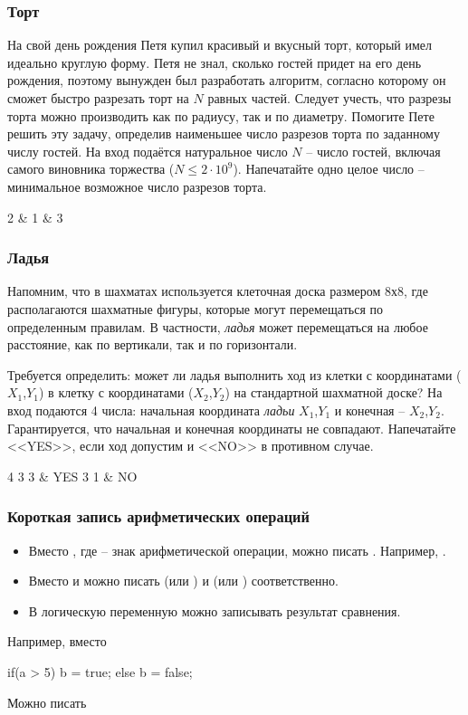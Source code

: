 \begin{frame}
	\frametitle{Торт}
	На свой день рождения Петя купил красивый и вкусный торт, который имел
	идеально круглую форму. Петя не знал, сколько гостей придет на его день
	рождения, поэтому вынужден был разработать алгоритм, согласно которому он
	сможет быстро разрезать торт на $N$ равных частей. Следует учесть, что разрезы
	торта можно производить как по радиусу, так и по диаметру.
	Помогите Пете решить эту задачу, определив наименьшее число разрезов торта по
	заданному числу гостей. 
	\inp
	На вход подаётся натуральное число $N$ – число гостей, включая самого виновника
	торжества ($N \leq 2\cdot10^9$).
	\out
	Напечатайте одно целое число -- минимальное возможное число разрезов торта.
	\begin{ex}
		2 & 1  & 3 \tb
	\end{ex}
\end{frame}

\begin{frame}
	\frametitle{Ладья}
	Напомним, что в шахматах используется клеточная доска размером 8х8, где
	располагаются шахматные фигуры, которые могут перемещаться по определенным
	правилам. В частности, {\it ладья} может перемещаться на любое расстояние, как по
	вертикали, так и по горизонтали.

	Требуется определить: может ли ладья выполнить ход из клетки с координатами
	($X_1$,$Y_1$) в клетку с координатами ($X_2$,$Y_2$) на стандартной шахматной доске? 
	\inp
	На вход подаются 4 числа: начальная координата {\it ладьи} $X_1$,$Y_1$ и конечная
	-- $X_2$,$Y_2$. Гарантируется, что начальная и конечная координаты не совпадают.
	\out
	Напечатайте <<YES>>, если ход допустим и <<NO>> в противном случае. 
	\begin{ex}
		4 3  3 & YES  3  1 & NO \tb
	\end{ex}
\end{frame}

\begin{frame}[fragile]
	\frametitle{Короткая запись арифметических операций}

	\begin{itemize}
		\item Вместо , где  -- знак арифметической операции,
	можно писать . Например, .
		\item Вместо  и  можно писать  (или
	) и  (или ) соответственно.
		\item В логическую переменную можно записывать результат сравнения.
	\end{itemize}
	Например, вместо
	\begin{code}
if(a > 5) b = true;
else b = false;
	\end{code}
	Можно писать \\
\end{frame}

